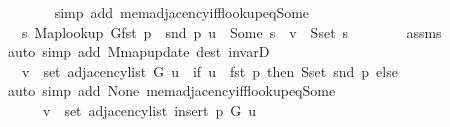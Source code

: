 \begin{isabellebody}
\ \ \ \ \ \ \isamarkupfalse%
\ {\isacharparenleft}{\kern0pt}simp\ add{\isacharcolon}{\kern0pt}\ mem{\isacharunderscore}{\kern0pt}adjacency{\isacharunderscore}{\kern0pt}iff{\isacharunderscore}{\kern0pt}lookup{\isacharunderscore}{\kern0pt}eq{\isacharunderscore}{\kern0pt}Some{\isacharparenright}{\kern0pt}\isanewline
\ \ \ \ \isamarkupfalse%
\ \isamarkupfalse%
\ {\isachardoublequoteopen}{\isachardot}{\kern0pt}{\isachardot}{\kern0pt}{\isachardot}{\kern0pt}\ {\isasymlongleftrightarrow}\ {\isacharparenleft}{\kern0pt}{\isasymexists}s{\isachardot}{\kern0pt}\ {\isacharparenleft}{\kern0pt}Map{\isacharunderscore}{\kern0pt}lookup\ G{\isacharparenleft}{\kern0pt}fst\ p\ {\isasymmapsto}\ snd\ p{\isacharparenright}{\kern0pt}{\isacharparenright}{\kern0pt}\ u\ {\isacharequal}{\kern0pt}\ Some\ s\ {\isasymand}\ v\ {\isasymin}\ S{\isachardot}{\kern0pt}set\ s{\isacharparenright}{\kern0pt}{\isachardoublequoteclose}\isanewline
\ \ \ \ \ \ \isamarkupfalse%
\ assms{\isacharparenleft}{\kern0pt}{}{\isacharparenright}{\kern0pt}\isanewline
\ \ \ \ \ \ \isamarkupfalse%
\ {\isacharparenleft}{\kern0pt}auto\ simp\ add{\isacharcolon}{\kern0pt}\ M{\isachardot}{\kern0pt}map{\isacharunderscore}{\kern0pt}update\ dest{\isacharcolon}{\kern0pt}\ invarD{\isacharparenleft}{\kern0pt}{}{\isacharparenright}{\kern0pt}{\isacharparenright}{\kern0pt}\isanewline
\ \ \ \ \isamarkupfalse%
\ \isamarkupfalse%
\ {\isachardoublequoteopen}{\isachardot}{\kern0pt}{\isachardot}{\kern0pt}{\isachardot}{\kern0pt}\ {\isasymlongleftrightarrow}\ v\ {\isasymin}\ set\ {\isacharparenleft}{\kern0pt}adjacency{\isacharunderscore}{\kern0pt}list\ G\ u{\isacharparenright}{\kern0pt}\ {\isasymunion}\ {\isacharparenleft}{\kern0pt}if\ u\ {\isacharequal}{\kern0pt}\ fst\ p\ then\ S{\isachardot}{\kern0pt}set\ {\isacharparenleft}{\kern0pt}snd\ p{\isacharparenright}{\kern0pt}\ else\ {\isacharbraceleft}{\kern0pt}{\isacharbraceright}{\kern0pt}{\isacharparenright}{\kern0pt}{\isachardoublequoteclose}\isanewline
\ \ \ \ \ \ \isamarkupfalse%
\ {\isacharparenleft}{\kern0pt}auto\ simp\ add{\isacharcolon}{\kern0pt}\ None\ mem{\isacharunderscore}{\kern0pt}adjacency{\isacharunderscore}{\kern0pt}iff{\isacharunderscore}{\kern0pt}lookup{\isacharunderscore}{\kern0pt}eq{\isacharunderscore}{\kern0pt}Some{\isacharparenright}{\kern0pt}\isanewline
\ \ \ \ \isamarkupfalse%
\ \isamarkupfalse%
\isanewline
\ \ \ \ \ \ {\isachardoublequoteopen}v\ {\isasymin}\ set\ {\isacharparenleft}{\kern0pt}adjacency{\isacharunderscore}{\kern0pt}list\ {\isacharparenleft}{\kern0pt}insert{\isacharunderscore}{\kern0pt}{}\ p\ G{\isacharparenright}{\kern0pt}\ u{\isacharparenright}{\kern0pt}\ {\isasymlongleftrightarrow}\isanewline

\end{isabellebody}
